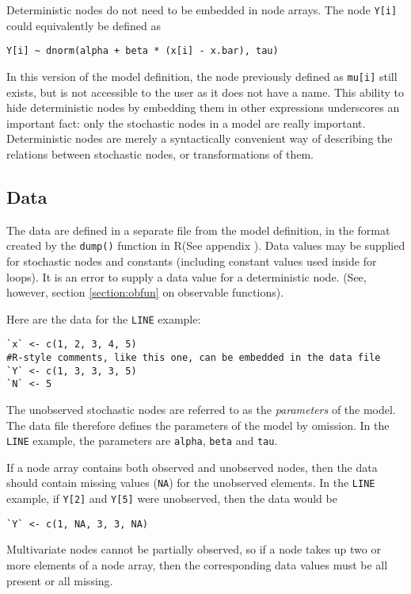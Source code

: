 \documentclass[11pt, a4paper, titlepage]{report}
\newcommand{\R}{\textsf{R}}
\begin{document}
Deterministic nodes do not need to be embedded in node arrays. The
node \verb+Y[i]+ could equivalently be defined as
\begin{verbatim}
Y[i] ~ dnorm(alpha + beta * (x[i] - x.bar), tau)
\end{verbatim}
In this version of the model definition, the node previously defined
as \verb+mu[i]+ still exists, but is not accessible to the user as it
does not have a name.  This ability to hide deterministic nodes by
embedding them in other expressions underscores an important fact:
only the stochastic nodes in a model are really
important. Deterministic nodes are merely a syntactically convenient
way of describing the relations between stochastic nodes, or
transformations of them.

\subsection{Data}
\label{section:data}

The data are defined in a separate file from the model definition, in
the format created by the \texttt{dump()} function in \R (See appendix
\cite{appendix:data}).  Data values may be supplied for stochastic
nodes and constants (including constant values used inside for
loops). It is an error to supply a data value for a deterministic
node. (See, however, section \ref{section:obfun} on observable
functions).

Here are the data for the \verb+LINE+ example:
\begin{verbatim}
`x` <- c(1, 2, 3, 4, 5)
#R-style comments, like this one, can be embedded in the data file
`Y` <- c(1, 3, 3, 3, 5)
`N` <- 5
\end{verbatim}

The unobserved stochastic nodes are referred to as the {\em
  parameters} of the model. The data file therefore defines the
parameters of the model by omission. In the \verb+LINE+ example, the
parameters are \texttt{alpha}, \texttt{beta} and \texttt{tau}.

If a node array contains both observed and unobserved nodes, then the
data should contain missing values (\texttt{NA}) for the unobserved
elements. In the \verb+LINE+ example, if \verb+Y[2]+ and \verb+Y[5]+
were unobserved, then the data would be
\begin{verbatim}
`Y` <- c(1, NA, 3, 3, NA)
\end{verbatim}
Multivariate nodes cannot be partially observed, so if a node takes up
two or more elements of a node array, then the corresponding data
values must be all present or all missing.
\end{document}
